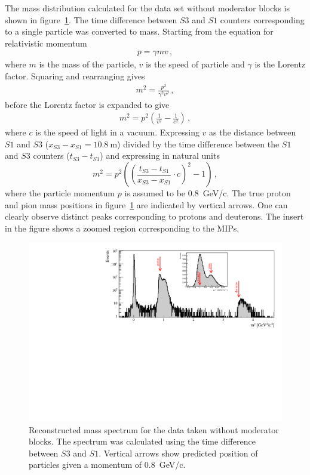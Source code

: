 The mass distribution calculated for the data set without moderator blocks is shown in figure~\ref{fig:s3tof_mass}.
The time difference between $\mathit{S3}$ and $\mathit{S1}$ counters corresponding to a single particle was converted to mass.
Starting from the equation for relativistic momentum
\begin{align}
p = \gamma m v \,,
\end{align}
where $m$ is the mass of the particle, $v$ is the speed of particle and $\gamma$ is the Lorentz factor.
Squaring and rearranging gives
\begin{align}
  m^{2} = \frac{p^{2}}{\gamma^{2} v^{2}} \,,
\end{align}
before the Lorentz factor is expanded to give
\begin{align}
  m^{2} = p^{2}\left(\frac{1}{v^{2}} - \frac{1}{c^{2}}\right) \,,
\end{align}
where $c$ is the speed of light in a vacuum. Expressing $v$ as the distance between $\mathit{S1}$ and $\mathit{S3}$ ($x_{\mathit{S3}}-x_{\mathit{S1}} = 10.8~\text{m}$) divided by the time difference between the $\mathit{S1}$ and $\mathit{S3}$ counters ($t_{\mathit{S3}} - t_{\mathit{S1}}$) and expressing in natural units 
\begin{equation} 
  m^2 = p^2 \left( 
  \left(\frac{t_{\mathit{S3}}-t_{\mathit{S1}}}{x_{\mathit{S3}}-x_{\mathit{S1}}} \cdot c \right)^2
  - 1  \right) \,,
  \label{eq:recoMass}
\end{equation}
where the particle momentum $p$ is assumed to be 0.8~GeV/c.
The true proton and pion mass positions in figure~\ref{fig:s3tof_mass} are indicated by vertical arrows.
One can clearly observe distinct peaks corresponding to protons and deuterons. 
The insert in the figure shows a zoomed region corresponding to the MIPs. 

\begin{figure}[ht]
  \centering
  \includegraphics[width=0.9\linewidth]{files/Figures/Data_2018_8_31_b2_800MeV_0block_All.pdf}
  \caption{Reconstructed mass spectrum for the data taken without moderator blocks. The spectrum was calculated using the time difference between $\mathit{S3}$ and $\mathit{S1}$. Vertical arrows show predicted position of particles given a momentum of 0.8~GeV/c.}
  \label{fig:s3tof_mass}
\end{figure}

